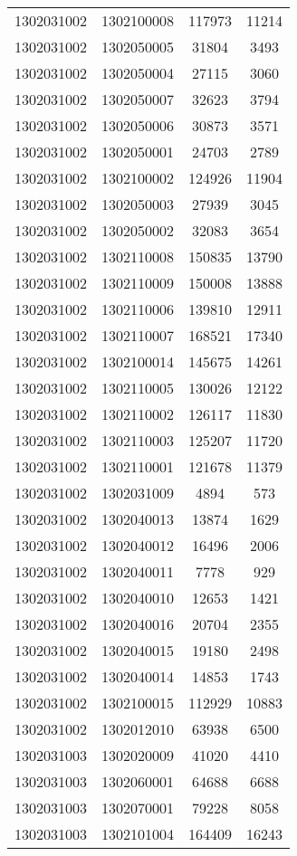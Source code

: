 \begin{longtable}[h]{llcc}
		1302031002 & 1302100008 & 117973 & 11214\\
		1302031002 & 1302050005 & 31804 & 3493\\
		1302031002 & 1302050004 & 27115 & 3060\\
		1302031002 & 1302050007 & 32623 & 3794\\
		1302031002 & 1302050006 & 30873 & 3571\\
		1302031002 & 1302050001 & 24703 & 2789\\
		1302031002 & 1302100002 & 124926 & 11904\\
		1302031002 & 1302050003 & 27939 & 3045\\
		1302031002 & 1302050002 & 32083 & 3654\\
		1302031002 & 1302110008 & 150835 & 13790\\
		1302031002 & 1302110009 & 150008 & 13888\\
		1302031002 & 1302110006 & 139810 & 12911\\
		1302031002 & 1302110007 & 168521 & 17340\\
		1302031002 & 1302100014 & 145675 & 14261\\
		1302031002 & 1302110005 & 130026 & 12122\\
		1302031002 & 1302110002 & 126117 & 11830\\
		1302031002 & 1302110003 & 125207 & 11720\\
		1302031002 & 1302110001 & 121678 & 11379\\
		1302031002 & 1302031009 & 4894 & 573\\
		1302031002 & 1302040013 & 13874 & 1629\\
		1302031002 & 1302040012 & 16496 & 2006\\
		1302031002 & 1302040011 & 7778 & 929\\
		1302031002 & 1302040010 & 12653 & 1421\\
		1302031002 & 1302040016 & 20704 & 2355\\
		1302031002 & 1302040015 & 19180 & 2498\\
		1302031002 & 1302040014 & 14853 & 1743\\
		1302031002 & 1302100015 & 112929 & 10883\\
		1302031002 & 1302012010 & 63938 & 6500\\
		1302031003 & 1302020009 & 41020 & 4410\\
		1302031003 & 1302060001 & 64688 & 6688\\
		1302031003 & 1302070001 & 79228 & 8058\\
		1302031003 & 1302101004 & 164409 & 16243\\

\end{longtable}
